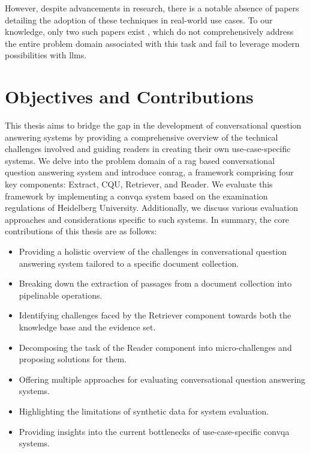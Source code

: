 However, despite advancements in research, there is a notable absence of papers detailing the adoption of these techniques in real-world use cases. To our knowledge, only two such papers exist \cite{feng_dialdoc_2021,gholami_zero-shot_2021}, which do not comprehensively address the entire problem domain associated with this task and fail to leverage modern possibilities with \gls{llm}s.

\section{Objectives and Contributions}

This thesis aims to bridge the gap in the development of conversational question answering systems by providing a comprehensive overview of the technical challenges involved and guiding readers in creating their own use-case-specific systems. We delve into the problem domain of a \gls{rag} based conversational question answering system and introduce \gls{conrag}, a framework comprising four key components: Extract, CQU, Retriever, and Reader. We evaluate this framework by implementing a \gls{convqa} system based on the examination regulations of Heidelberg University. Additionally, we discuss various evaluation approaches and considerations specific to such systems. In summary, the core contributions of this thesis are as follows:

\begin{itemize}
    \item Providing a holistic overview of the challenges in conversational question answering system tailored to a specific document collection.
    \item Breaking down the extraction of passages from a document collection into pipelinable operations.
    \item Identifying challenges faced by the Retriever component towards both the knowledge base and the evidence set.
    \item Decomposing the task of the Reader component into micro-challenges and proposing solutions for them.
    \item Offering multiple approaches for evaluating conversational question answering systems.
    \item Highlighting the limitations of synthetic data for system evaluation.
    \item Providing insights into the current bottlenecks of use-case-specific \gls{convqa} systems.
\end{itemize}

